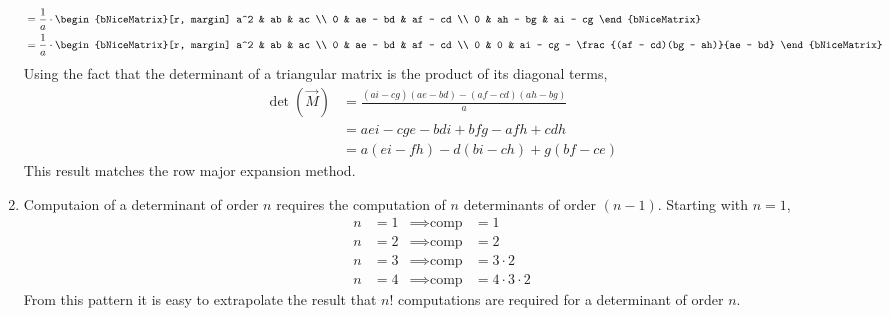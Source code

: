 \begin{enumerate}
\begin{align}
                      & = \frac{1}{a} \cdot \begin{bNiceMatrix}[r, margin]
                                                a^2 & ab      & ac      \\
                                                0   & ae - bd & af - cd \\
                                                0   & ah - bg & ai - cg
                                            \end{bNiceMatrix}     \\
                      & = \frac{1}{a} \cdot \begin{bNiceMatrix}[r, margin]
                                                a^2 & ab      & ac        \\
                                                0   & ae - bd & af - cd   \\
                                                0   & 0       & ai - cg -
                                                \frac{(af - cd)(bg - ah)}{ae - bd}
                                            \end{bNiceMatrix}
          \end{align}
          Using the fact that the determinant of a triangular matrix is the product of
          its diagonal terms,
          \begin{align}
              \det(\vec{M}) & = \frac{(ai - cg)(ae - bd) - (af - cd)(ah - bg)}{a} \\
                            & = aei - cge - bdi + bfg - afh + cdh                 \\
                            & = a(ei - fh) - d(bi - ch) + g(bf - ce)
          \end{align}
          This result matches the row major expansion method.

    \item Computaion of a determinant of order $ n $ requires the computation of
          $ n $ determinants of order $ (n-1) $. Starting with $ n = 1 $,
          \begin{align}
              n & = 1 & \implies \text{comp} & = 1                 \\
              n & = 2 & \implies \text{comp} & = 2                 \\
              n & = 3 & \implies \text{comp} & = 3 \cdot 2         \\
              n & = 4 & \implies \text{comp} & = 4 \cdot 3 \cdot 2
          \end{align}
          From this pattern it is easy to extrapolate the result that $ n! $
          computations are required for a determinant of order $ n $.


\end{enumerate}
